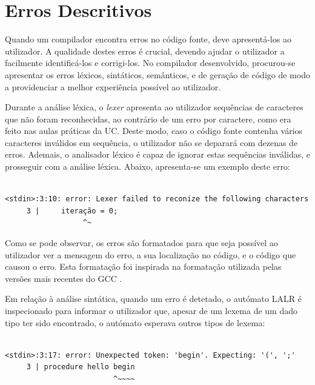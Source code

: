 \documentclass[12pt, a4paper]{article}
\begin{document}
\section{Erros Descritivos}

Quando um compilador encontra erros no código fonte, deve apresentá-los ao utilizador. A qualidade
destes erros é crucial, devendo ajudar o utilizador a facilmente identificá-los e corrigi-los. No
compilador desenvolvido, procurou-se apresentar os erros léxicos, sintáticos, semânticos, e de
geração de código de modo a providenciar a melhor experiência possível ao utilizador.

Durante a análise léxica, o \emph{lexer} apresenta ao utilizador sequências de caracteres que não
foram reconhecidas, ao contrário de um erro por caractere, como era feito nas aulas práticas da UC.
Deste modo, caso o código fonte contenha vários caracteres inválidos em sequência, o utilizador não
se deparará com dezenas de erros. Ademais, o analisador léxico é capaz de ignorar estas sequências
inválidas, e prosseguir com a análise léxica. Abaixo, apresenta-se um exemplo deste erro:


\begin{lstlisting}

<stdin>:3:10: error: Lexer failed to reconize the following characters
     3 |     iteração = 0;
                  ^~
\end{lstlisting}

Como se pode observar, os erros são formatados para que seja possível ao utilizador ver a mensagem
do erro, a sua localização no código, e o código que causou o erro. Esta formatação foi inspirada na
formatação utilizada pelas versões mais recentes do GCC \cite{gcc-errors}.

Em relação à análise sintática, quando um erro é detetado, o autómato LALR é inspecionado para
informar o utilizador que, apesar de um lexema de um dado tipo ter sido encontrado, o autómato
esperava outros tipos de lexema:

\begin{lstlisting}

<stdin>:3:17: error: Unexpected token: 'begin'. Expecting: '(', ';'
     3 | procedure hello begin
                         ^~~~~
\end{lstlisting}
\end{document}
